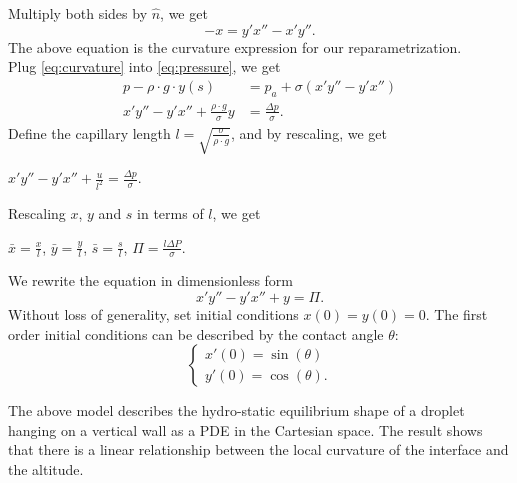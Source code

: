 \documentclass{jfm}
\begin{document}
    Multiply both sides by $\hat{n}$, we get\\
    \begin{equation}
        -x=y'x''-x'y''. 
        \label{eq:curvature}
    \end{equation}
    The above equation is the curvature expression for our reparametrization.\\
    Plug \ref{eq:curvature} into \ref{eq:pressure}, we get\\
    \begin{align}
        p-\rho\cdot{g}\cdot{y(s)}&=p_{a}+\sigma(x'y''-y'x'')\\
        x'y''-y'x''+\frac{\rho\cdot{g}}{\sigma}y&=\frac{\Delta{p}}{\sigma}.
    \end{align}
    Define the capillary length $l=\sqrt{\frac{\sigma}{\rho\cdot{g}}}$,
    and by rescaling, we get\\
    \begin{center}
        $x'y''-y'x''+\frac{u}{l^2}=\frac{\Delta{p}}{\sigma}$.
    \end{center}
    Rescaling $x$, $y$ and $s$ in terms of $l$, we get\\
    \begin{center}
        $\bar{x}=\frac{x}{l}$, \quad $\bar{y}=\frac{y}{l}$, \quad $\bar{s}=\frac{s}{l}$, \quad $\Pi=\frac{l\Delta P}{\sigma}$.
    \end{center}
    We rewrite the equation in dimensionless form\\
    \begin{equation}
        x'y''-y'x''+y=\Pi.
    \end{equation}
    Without loss of generality, set initial conditions $x(0)=y(0)=0$. The first order initial conditions can be described by the contact angle $\theta$: 
    \begin{equation}
        \begin{cases}
            x'(0)=\sin(\theta)\\
            y'(0)=\cos(\theta).
        \end{cases}
    \end{equation}
    
    The above model describes the hydro-static equilibrium shape of a droplet hanging on a vertical wall as a PDE in the Cartesian space. The result shows that there is a linear relationship between the local curvature of the interface and the altitude. 



\end{document}
